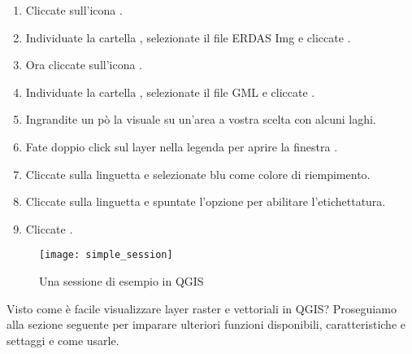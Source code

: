 
\begin{enumerate}
\item Cliccate sull'icona . 
\item Individuate la cartella ,
selezionate il file ERDAS Img  e cliccate
. 
\item Ora cliccate sull'icona . 
\item Individuate la cartella , selezionate
il file GML  e cliccate . 
\item Ingrandite un pò la visuale su un'area a vostra scelta con alcuni laghi. 
\item Fate doppio click sul layer  nella legenda per
aprire la finestra . 
\item Cliccate sulla linguetta  e selezionate blu come
colore di riempimento. 
\item Cliccate sulla linguetta  e spuntate l'opzione  per abilitare l'etichettatura. 
\item Cliccate .
\end{enumerate} 

\begin{figure}[ht]
   \begin{center}
   \caption{Una sessione di esempio in QGIS \nixcaption}\label{fig:simple_session}\smallskip
   \texttt{[image: simple\_session]}
\end{center}  
\end{figure}

Visto come è facile visualizzare layer raster e vettoriali in QGIS?
Proseguiamo alla sezione seguente per imparare ulteriori funzioni
disponibili, caratteristiche e settaggi e come usarle.
